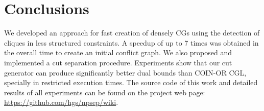 \documentclass{endm}
\begin{document}
\section{Conclusions}\label{conclusions}

We developed an approach for fast creation of densely CGs using the detection of cliques in less structured constraints. A speedup of up to 7 times was obtained in the overall time to create an initial conflict graph. We also proposed and implemented a cut separation procedure. Experiments show that our cut generator can produce significantly better dual bounds than COIN-OR CGL, specially in restricted execution times. The source code of this work and detailed results of all experiments can be found on the project web page: \url{https://github.com/hgs/npsep/wiki}.



\end{document}
